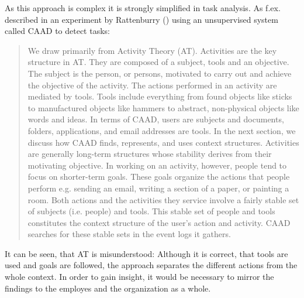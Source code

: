 As this approach is complex it is strongly simplified in task analysis. As f.ex. described in an experiment by Rattenburry (\cite{rattenbury2007caad}) using an unsupervised system called CAAD to detect tasks:
\begin{quotation}
We draw primarily from Activity Theory (AT). Activities are the key structure in AT. They are composed of a subject, tools and an objective. The subject is the person, or persons, motivated to carry out and achieve the objective of the activity. The actions performed in an activity are mediated by tools. Tools include everything from found objects like sticks to manufactured objects like hammers to abstract, non-physical objects like words and ideas. In terms of CAAD, users are subjects and documents, folders, applications, and email addresses are tools. In the next section, we discuss how CAAD finds, represents, and uses context structures. Activities are generally long-term structures whose stability derives from their motivating objective. In working on an activity, however, people tend to focus on shorter-term goals. These goals organize the actions that people perform e.g. sending an email, writing a section of a paper, or painting a room. Both actions and the activities they service involve a fairly stable set of subjects (i.e. people) and tools. This stable set of people and tools constitutes the context structure of the user’s action and activity. CAAD searches for these stable sets in the event logs it gathers.
\end{quotation}

It can be seen, that \ac{AT} is misunderstood: Although it is correct, that tools are used and goals are followed, the approach separates the different actions from the whole context. In order to gain insight, it would be necessary to mirror the findings to the employes and the organization as a whole. 


